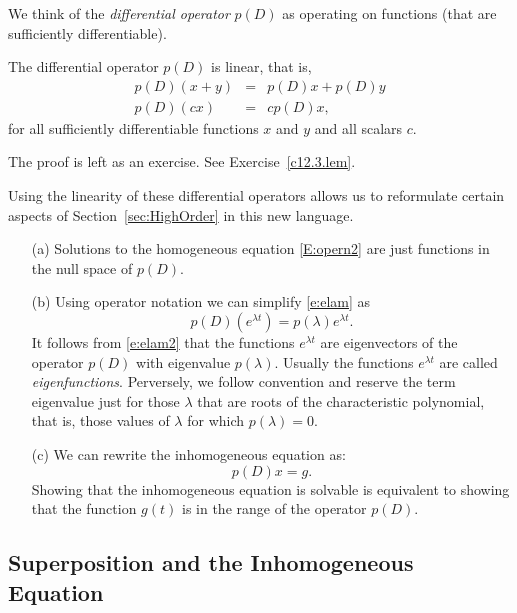 \documentclass{ximera}
\begin{document}
We think of the {\em differential 
operator\/} $p(D)$ as operating on 
functions (that are sufficiently differentiable). 
\begin{lemma}  \label{L:p(D)linear}
The differential operator $p(D)$ is linear, that is,
\begin{eqnarray*}
p(D)(x+y) & = & p(D)x + p(D)y \\
p(D)(cx) & = & cp(D)x,
\end{eqnarray*}
for all sufficiently differentiable functions $x$ and $y$ and all scalars $c$.
\end{lemma}
The proof is left as an exercise.  See Exercise~\ref{c12.3.lem}.

Using the linearity of these differential operators allows us to reformulate
certain aspects of Section~\ref{sec:HighOrder} in this new language.

\begin{enumerate}
\item[(a)]  Solutions to the homogeneous equation \eqref{E:opern2} are just 
functions in the null space 
of $p(D)$.  
\item[(b)]  Using operator notation we can simplify \eqref{e:elam} as
\begin{equation}  \label{e:elam2}
p(D)\left(e^{\lambda t}\right) = p(\lambda)e^{\lambda t}.
\end{equation}
It follows from \eqref{e:elam2} that the functions $e^{\lambda t}$ are 
eigenvectors 
of the operator $p(D)$ with eigenvalue $p(\lambda)$.  
Usually the functions $e^{\lambda t}$ are called 
{\em eigenfunctions}.
Perversely, we follow convention and reserve the term eigenvalue just 
for those $\lambda$ that are roots of the characteristic polynomial, that 
is, those values of $\lambda$ for which $p(\lambda)=0$.
\item[(c)]  We can rewrite the 
inhomogeneous equation as:
\[
p(D)x = g.
\]
Showing that the inhomogeneous equation is solvable is
equivalent to showing that the 
function $g(t)$ is in the range 
of the operator $p(D)$.
\end{enumerate}

\subsection*{Superposition and the Inhomogeneous Equation}
\end{document}
